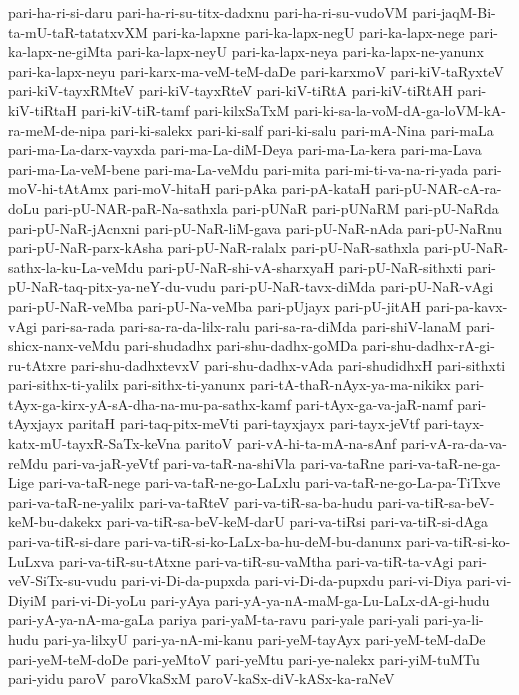 {pari-ha-ri-si-daru
pari-ha-ri-su-titx-dadxnu
pari-ha-ri-su-vudoVM
pari-jaqM-Bi-ta-mU-taR-tatatxvXM
pari-ka-lapxne
pari-ka-lapx-negU
pari-ka-lapx-nege
pari-ka-lapx-ne-giMta
pari-ka-lapx-neyU
pari-ka-lapx-neya
pari-ka-lapx-ne-yanunx
pari-ka-lapx-neyu
pari-karx-ma-veM-teM-daDe
pari-karxmoV
pari-kiV-taRyxteV
pari-kiV-tayxRMteV
pari-kiV-tayxRteV
pari-kiV-tiRtA
pari-kiV-tiRtAH
pari-kiV-tiRtaH
pari-kiV-tiR-tamf
pari-kilxSaTxM
pari-ki-sa-la-voM-dA-ga-loVM-kA-ra-meM-de-nipa
pari-ki-salekx
pari-ki-salf
pari-ki-salu
pari-mA-Nina
pari-maLa
pari-ma-La-darx-vayxda
pari-ma-La-diM-Deya
pari-ma-La-kera
pari-ma-Lava
pari-ma-La-veM-bene
pari-ma-La-veMdu
pari-mita
pari-mi-ti-va-na-ri-yada
pari-moV-hi-tAtAmx
pari-moV-hitaH
pari-pAka
pari-pA-kataH
pari-pU-NAR-cA-ra-doLu
pari-pU-NAR-paR-Na-sathxla
pari-pUNaR
pari-pUNaRM
pari-pU-NaRda
pari-pU-NaR-jAcnxni
pari-pU-NaR-liM-gava
pari-pU-NaR-nAda
pari-pU-NaRnu
pari-pU-NaR-parx-kAsha
pari-pU-NaR-ralalx
pari-pU-NaR-sathxla
pari-pU-NaR-sathx-la-ku-La-veMdu
pari-pU-NaR-shi-vA-sharxyaH
pari-pU-NaR-sithxti
pari-pU-NaR-taq-pitx-ya-neY-du-vudu
pari-pU-NaR-tavx-diMda
pari-pU-NaR-vAgi
pari-pU-NaR-veMba
pari-pU-Na-veMba
pari-pUjayx
pari-pU-jitAH
pari-pa-kavx-vAgi
pari-sa-rada
pari-sa-ra-da-lilx-ralu
pari-sa-ra-diMda
pari-shiV-lanaM
pari-shicx-nanx-veMdu
pari-shudadhx
pari-shu-dadhx-goMDa
pari-shu-dadhx-rA-gi-ru-tAtxre
pari-shu-dadhxtevxV
pari-shu-dadhx-vAda
pari-shudidhxH
pari-sithxti
pari-sithx-ti-yalilx
pari-sithx-ti-yanunx
pari-tA-thaR-nAyx-ya-ma-nikikx
pari-tAyx-ga-kirx-yA-sA-dha-na-mu-pa-sathx-kamf
pari-tAyx-ga-va-jaR-namf
pari-tAyxjayx
paritaH
pari-taq-pitx-meVti
pari-tayxjayx
pari-tayx-jeVtf
pari-tayx-katx-mU-tayxR-SaTx-keVna
paritoV
pari-vA-hi-ta-mA-na-sAnf
pari-vA-ra-da-va-reMdu
pari-va-jaR-yeVtf
pari-va-taR-na-shiVla
pari-va-taRne
pari-va-taR-ne-ga-Lige
pari-va-taR-nege
pari-va-taR-ne-go-LaLxlu
pari-va-taR-ne-go-La-pa-TiTxve
pari-va-taR-ne-yalilx
pari-va-taRteV
pari-va-tiR-sa-ba-hudu
pari-va-tiR-sa-beV-keM-bu-dakekx
pari-va-tiR-sa-beV-keM-darU
pari-va-tiRsi
pari-va-tiR-si-dAga
pari-va-tiR-si-dare
pari-va-tiR-si-ko-LaLx-ba-hu-deM-bu-danunx
pari-va-tiR-si-ko-LuLxva
pari-va-tiR-su-tAtxne
pari-va-tiR-su-vaMtha
pari-va-tiR-ta-vAgi
pari-veV-SiTx-su-vudu
pari-vi-Di-da-pupxda
pari-vi-Di-da-pupxdu
pari-vi-Diya
pari-vi-DiyiM
pari-vi-Di-yoLu
pari-yAya
pari-yA-ya-nA-maM-ga-Lu-LaLx-dA-gi-hudu
pari-yA-ya-nA-ma-gaLa
pariya
pari-yaM-ta-ravu
pari-yale
pari-yali
pari-ya-li-hudu
pari-ya-lilxyU
pari-ya-nA-mi-kanu
pari-yeM-tayAyx
pari-yeM-teM-daDe
pari-yeM-teM-doDe
pari-yeMtoV
pari-yeMtu
pari-ye-nalekx
pari-yiM-tuMTu
pari-yidu
paroV
paroVkaSxM
paroV-kaSx-diV-kASx-ka-raNeV
}
